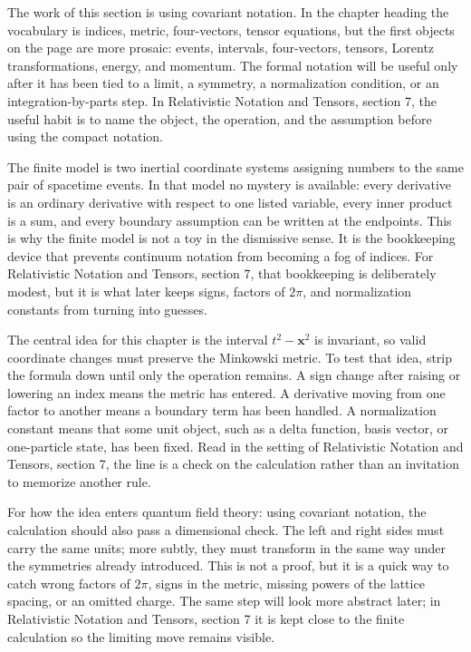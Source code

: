 The work of this section is using covariant notation.  In the chapter heading the vocabulary is indices, metric, four-vectors, tensor equations, but the first objects on the page are more prosaic: events, intervals, four-vectors, tensors, Lorentz transformations, energy, and momentum.  The formal notation will be useful only after it has been tied to a limit, a symmetry, a normalization condition, or an integration-by-parts step.  In Relativistic Notation and Tensors, section 7, the useful habit is to name the object, the operation, and the assumption before using the compact notation.

The finite model is two inertial coordinate systems assigning numbers to the same pair of spacetime events.  In that model no mystery is available: every derivative is an ordinary derivative with respect to one listed variable, every inner product is a sum, and every boundary assumption can be written at the endpoints.  This is why the finite model is not a toy in the dismissive sense.  It is the bookkeeping device that prevents continuum notation from becoming a fog of indices.  For Relativistic Notation and Tensors, section 7, that bookkeeping is deliberately modest, but it is what later keeps signs, factors of \(2\pi\), and normalization constants from turning into guesses.

The central idea for this chapter is the interval \(t^2-\bm x^2\) is invariant, so valid coordinate changes must preserve the Minkowski metric.  To test that idea, strip the formula down until only the operation remains.  A sign change after raising or lowering an index means the metric has entered.  A derivative moving from one factor to another means a boundary term has been handled.  A normalization constant means that some unit object, such as a delta function, basis vector, or one-particle state, has been fixed.  Read in the setting of Relativistic Notation and Tensors, section 7, the line is a check on the calculation rather than an invitation to memorize another rule.

For how the idea enters quantum field theory: using covariant notation, the calculation should also pass a dimensional check.  The left and right sides must carry the same units; more subtly, they must transform in the same way under the symmetries already introduced.  This is not a proof, but it is a quick way to catch wrong factors of \(2\pi\), signs in the metric, missing powers of the lattice spacing, or an omitted charge.  The same step will look more abstract later; in Relativistic Notation and Tensors, section 7 it is kept close to the finite calculation so the limiting move remains visible.

